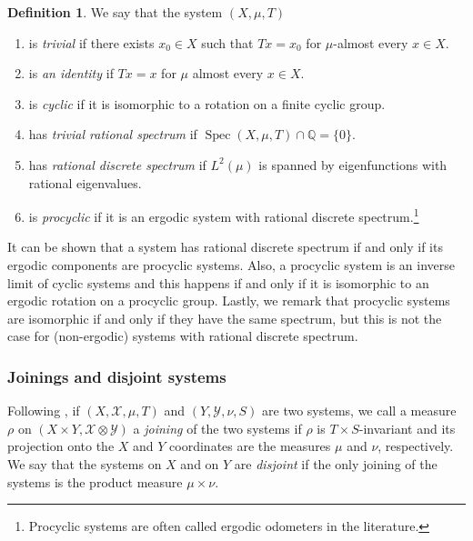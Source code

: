 \documentclass[11pt]{amsart}
\theoremstyle{definition}
\newtheorem{definition}{Definition}[section]
\newcommand{\Q}{{\mathbb Q}}
\newcommand{\CX}{{\mathcal X}}
\newcommand{\CY}{{\mathcal Y}}
\DeclareMathOperator{\spec}{Spec}
\begin{document}
\begin{definition}
We say that the system $(X,\mu,T)$
\begin{enumerate}
	\item is {\em trivial} if there exists $x_0\in X$ such that $Tx=x_0$
	for $\mu$-almost every $x\in X$.
	
	 \smallskip
	
\item is {\em an identity} if $Tx=x$ for $\mu$ almost every $x\in X$.

\smallskip

\item is {\em cyclic}  if it is isomorphic to a rotation on a finite cyclic group.

\smallskip

\item has {\em trivial rational spectrum} if $\spec(X,\mu,T)\cap \Q=\{0\}$.

\smallskip

	\item  has {\em  rational discrete spectrum}  if $L^2(\mu)$ is spanned by eigenfunctions with rational eigenvalues.

\smallskip

\item is {\em procyclic}  if it is an ergodic system with rational discrete spectrum.\footnote{ Procyclic systems are often called ergodic odometers in the literature.}
\end{enumerate}
\end{definition}
It can be shown that  a system has  rational discrete spectrum  if and only if its ergodic components are procyclic systems. Also, a procyclic
system is an inverse limit of cyclic systems and this happens if and only if it is isomorphic to an ergodic rotation on a procyclic group.
Lastly, we remark that  procyclic systems are isomorphic if and only if they have   the same spectrum, but this is not the case for
(non-ergodic) systems with rational discrete spectrum.


\subsubsection*{Joinings and disjoint systems}
Following \cite{Fu67}, if $(X,\CX, \mu,T)$ and $(Y,\CY, \nu,S)$ are two systems, we call a measure $\rho$ on $(X\times Y, \CX\otimes \CY)$ a {\em joining} of the two systems
if $\rho$  is $T\times S$-invariant and its projection onto the  $X$ and $Y$ coordinates are the measures $\mu$ and $\nu$, respectively. We say that the systems on $X$ and on $Y$ are {\em disjoint} if the only joining of the systems
is the product measure $\mu\times \nu$.
\end{document}
